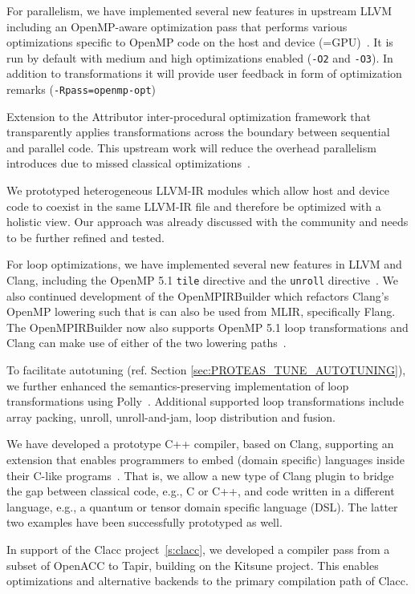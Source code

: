 For parallelism, we have implemented several new features in upstream LLVM
including an OpenMP-aware optimization pass that performs various optimizations
specific to OpenMP code on the host and device (=GPU)~\cite{OpenMPOpt2020}. It
is run by default with medium and high optimizations enabled (\texttt{-O2} and
\texttt{-O3}). In addition to transformations it will provide user feedback in form
of optimization remarks (\texttt{-Rpass=openmp-opt})

Extension to the Attributor inter-procedural optimization framework that
transparently applies transformations across the  boundary between sequential
and parallel code. This upstream work will reduce the overhead parallelism
introduces due to missed classical optimizations~\cite{giorgis2020}.

We prototyped heterogeneous LLVM-IR modules which allow host and device code to
coexist in the same LLVM-IR file and therefore be optimized with a holistic
view. Our approach was already discussed with the community and needs to be
further refined and tested.

For loop optimizations, we have implemented several new features in LLVM and
Clang, including the OpenMP 5.1 \texttt{tile} directive and the \texttt{unroll} directive~\cite{kruse2021openmpbooth}.
We also continued development of the OpenMPIRBuilder which refactors Clang's OpenMP lowering such that is can also be used from MLIR, specifically Flang.
The OpenMPIRBuilder now also supports OpenMP 5.1 loop transformations and Clang can make use of either of the two lowering paths~\cite{kruse2021clangast}.

To facilitate autotuning (ref. Section \ref{sec:PROTEAS_TUNE_AUTOTUNING}), we further
enhanced the semantics-preserving implementation of loop transformations using Polly~\cite{wu2021autotuning}.
Additional supported loop transformations include array packing, unroll, unroll-and-jam, loop distribution and fusion.

We have developed a prototype C++ compiler, based on Clang, supporting an
extension that enables programmers to embed (domain specific) languages inside
their C-like programs~\cite{finkel2020dsl}. That is, we allow a new type of
Clang plugin to bridge the gap between classical code, e.g., C or C++, and code
written in a different language, e.g., a quantum or tensor domain specific
language (DSL). The latter two examples have been successfully prototyped as
well.

In support of the Clacc project~\ref{s:clacc}, we developed a compiler
pass from a subset of OpenACC to Tapir, building on the Kitsune
project. This enables optimizations and alternative backends to the
primary compilation path of Clacc.

